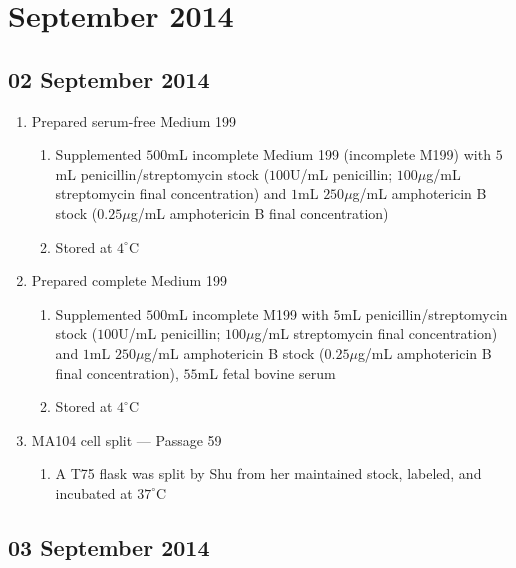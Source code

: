 
\section{September 2014}

\subsection*{02 September 2014}

\begin{enumerate}
	\item Prepared serum-free Medium 199
		\begin{enumerate}
			\item Supplemented $500$mL incomplete Medium 199 (incomplete M199) with $5$mL penicillin/streptomycin stock ($100$U/mL penicillin; $100\mu$g/mL streptomycin final concentration) and $1$mL $250\mu$g/mL amphotericin B stock ($0.25\mu$g/mL amphotericin B final concentration)
			\item Stored at $4^{\circ}$C
		\end{enumerate}
	\item Prepared complete Medium 199
		\begin{enumerate}
				\item Supplemented $500$mL incomplete M199 with $5$mL penicillin/streptomycin stock ($100$U/mL penicillin; $100\mu$g/mL streptomycin final concentration) and $1$mL $250\mu$g/mL amphotericin B stock ($0.25\mu$g/mL amphotericin B final concentration), $55$mL fetal bovine serum
				\item Stored at $4^{\circ}$C
		\end{enumerate}
	\item MA104 cell split --- Passage 59
		\begin{enumerate}
			\item A T75 flask was split by Shu from her maintained stock, labeled, and incubated at $37^{\circ}$C
		\end{enumerate}
\end{enumerate}

\subsection*{03 September 2014}

